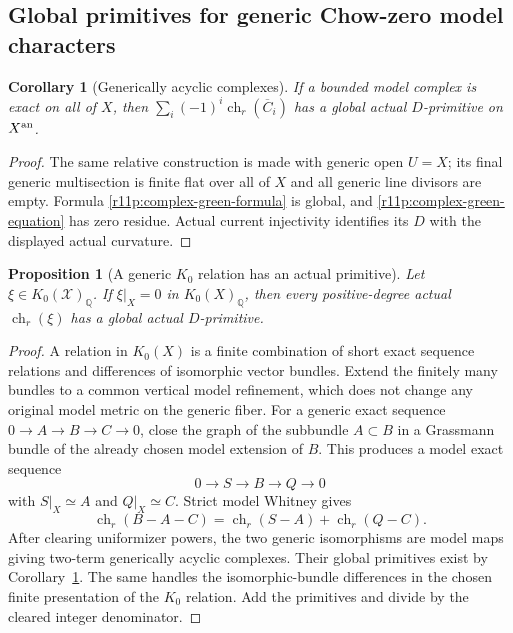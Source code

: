 \documentclass[11pt,a4paper]{article}
\newtheorem{proposition}[theorem]{Proposition}
\newtheorem{corollary}[theorem]{Corollary}
\theoremstyle{definition}
\theoremstyle{remark}
\begin{document}
\subsection{Global primitives for generic Chow-zero model characters}

\begin{corollary}[Generically acyclic complexes]
\label{r11p:acyclic}
If a bounded model complex is exact on all of $X$, then
$\sum_i(-1)^i\operatorname{ch}_r(\overline C_i)$ has a global actual
$D$-primitive on $X^{\rm an}$.
\end{corollary}

\begin{proof}
The same relative construction is made with generic open $U=X$;
its final generic multisection is finite flat over all of $X$ and all
generic line divisors are empty.  Formula \eqref{r11p:complex-green-formula}
is global, and \eqref{r11p:complex-green-equation} has zero residue.
Actual current injectivity identifies its $D$ with the displayed
actual curvature.
\end{proof}

\begin{proposition}[A generic $K_0$ relation has an actual primitive]
\label{r11p:generic-k-primitive}
Let $\xi\in K_0(\mathcal X)_{\mathbb Q}$.  If $\xi|_X=0$ in
$K_0(X)_{\mathbb Q}$, then every positive-degree actual
$\operatorname{ch}_r(\xi)$ has a global actual $D$-primitive.
\end{proposition}

\begin{proof}
A relation in $K_0(X)$ is a finite combination of short exact sequence
relations and differences of isomorphic vector bundles.  Extend the
finitely many bundles to a common vertical model refinement, which
does not change any original model metric on the generic fiber.
For a generic exact sequence $0\to A\to B\to C\to0$, close the graph
of the subbundle $A\subset B$ in a Grassmann bundle of the already
chosen model extension of $B$.  This produces a model exact sequence
\[
                         0\to S\to B\to Q\to0
\]
with $S|_X\simeq A$ and $Q|_X\simeq C$.  Strict model Whitney gives
\[
      \operatorname{ch}_r(B-A-C)
       =\operatorname{ch}_r(S-A)+\operatorname{ch}_r(Q-C).
\]
After clearing uniformizer powers, the two generic isomorphisms are
model maps giving two-term generically acyclic complexes.  Their
global primitives exist by Corollary~\ref{r11p:acyclic}.
The same handles the isomorphic-bundle differences in the chosen
finite presentation of the $K_0$ relation.  Add the primitives and
divide by the cleared integer denominator.
\end{proof}
\end{document}
